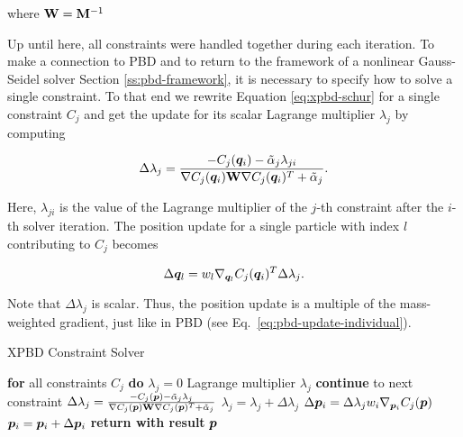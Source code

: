 \noindent where $\mathbf{W} = \mathbf{M}^{-1}$

Up until here, all constraints were handled together during each iteration. To make a connection to PBD and to return to the framework of a
nonlinear Gauss-Seidel solver Section \ref{ss:pbd-framework}, it is necessary to specify how to solve a single constraint. To that end we rewrite 
Equation \ref{eq:xpbd-schur} for a single constraint $C_j$ and get the update for its scalar Lagrange multiplier $\lambda_j$ by computing

\begin{equation}\label{eq:xpbd-lambda-j}
    \Delta \lambda_j = \frac{-C_j(\bm{q}_i) - \tilde{\alpha}_j \lambda_{ji}}{\nabla C_j(\bm{q}_i) \mathbf{W} \nabla C_j(\bm{q}_i)^T + \tilde{\alpha}_j}.
\end{equation}

\noindent Here, $\lambda_{ji}$ is the value of the Lagrange multiplier of the $j$-th constraint after the $i$-th solver iteration. The position update for 
a single particle with index $l$ contributing to $C_j$ becomes

\begin{equation}\label{eq:xpbd-position-update-i}
    \Delta \bm{q}_l = w_l \nabla_{\bm{q}_l} C_j(\bm{q}_i)^T \Delta \lambda_j.
\end{equation}

\noindent Note that $\Delta \lambda_j$ is scalar. Thus, the position update is a multiple of the mass-weighted gradient, just like in PBD 
(see Eq.\ \ref{eq:pbd-update-individual}).

\begin{algorithm}[t]
\caption{XPBD Constraint Solver}\label{alg:xpbd-solver}
\begin{algorithmic}[1]
\State \textbf{for} all constraints $C_j$ \textbf{do} $\lambda_j = 0$
\StatexIndent[3] Lagrange multiplier $\lambda_j$ \algorithmicdo
{}
\State \textbf{continue} to next constraint
\EndIf
\State $\Delta \lambda_j = \frac{-C_j(\bm{p}) - \tilde{\alpha}_j \lambda_{j}}{\nabla C_j(\bm{p}) \mathbf{W} \nabla C_j(\bm{p})^T + \tilde{\alpha}_j}$
\State $\lambda_{j} = \lambda_{j} + \Delta \lambda_j$
\State $\Delta \bm{p}_i = \Delta \lambda_j w_i \nabla_{\bm{p}_i} C_j(\bm{p})$
\State $\bm{p}_i = \bm{p}_i + \Delta \bm{p}_i$
\EndFor
\EndFor
\EndFor
\State \textbf{return with result } $\bm{p}$
\EndProcedure
\end{algorithmic}
\end{algorithm}

